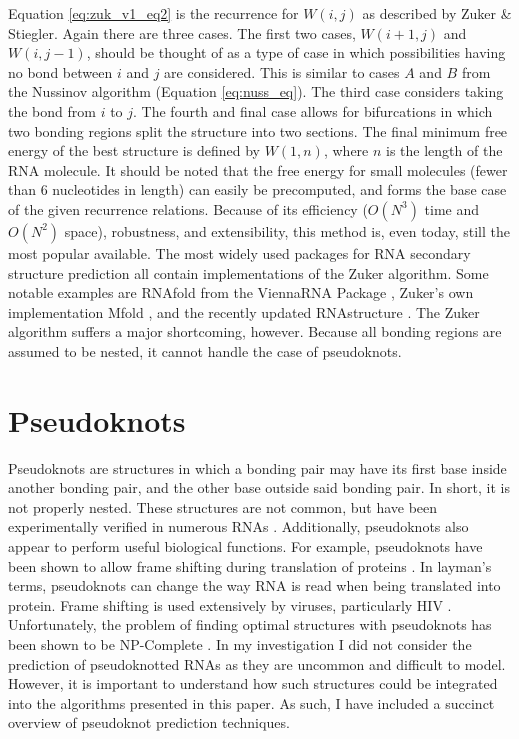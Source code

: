 \documentclass{cshonours}
\begin{document}
Equation \ref{eq:zuk_v1_eq2} is the recurrence for $W(i, j)$ as described by Zuker \& Stiegler.
Again there are three cases. The first two cases, $W (i + 1, j)$ and $W(i, j - 1)$,
should be thought of as a type of case in which possibilities having no bond between $i$ and $j$ are considered. This is similar to cases $A$ and $B$ from the Nussinov algorithm (Equation \ref{eq:nuss_eq}). The third case considers taking the bond from
$i$ to $j$. The fourth and final case allows for bifurcations in which two bonding regions split
the structure into two sections. The final minimum free energy of the best structure is defined by $W(1, n)$, where $n$ is the length of the RNA molecule. It should
be noted that the free energy for small molecules (fewer than 6 nucleotides in length) can easily be
precomputed, and forms the base case of the given recurrence relations. Because of
its efficiency ($O(N^3)$ time and $O(N^2)$ space), robustness, and extensibility, this method is,
even today, still the most popular available. The most widely used packages for RNA secondary structure prediction all contain implementations of the Zuker algorithm. Some notable examples are RNAfold from the ViennaRNA Package \cite{lorenz2011viennarna}, Zuker's own implementation Mfold \cite{zuker2003mfold}, and the recently updated RNAstructure \cite{bellaousov2013rnastructure}. The Zuker algorithm suffers a major shortcoming, however. Because all bonding regions are assumed to be nested, it
cannot handle the case of pseudoknots. 


\section{Pseudoknots}

Pseudoknots are structures in which a bonding pair may have its first
base inside another bonding pair, and the other base outside said bonding pair.
In short, it is not properly nested. These structures are not common,
but have been experimentally verified in numerous RNAs \cite{taufer2009pseudobase}. Additionally, pseudoknots also appear to perform useful biological functions. For
example, pseudoknots have been shown to allow frame shifting during translation
of proteins \cite{namy2006mechanical}. In layman's terms, pseudoknots can change the way RNA is read
when being translated into protein. Frame shifting is used extensively by
viruses, particularly HIV \cite{namy2006mechanical}. Unfortunately, the problem of finding optimal
structures with pseudoknots has been shown to be NP-Complete \cite{lyngso2000rna}. In my investigation I did not consider the prediction of pseudoknotted RNAs as they are uncommon and difficult to model. However, it is important to understand how such structures could be integrated into the algorithms presented in this paper. As such, I have included a succinct overview of pseudoknot prediction techniques.
\end{document}
